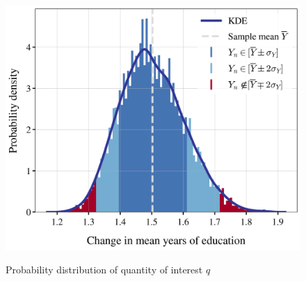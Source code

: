 \documentclass[a4paper,12pt]{article}
\begin{document}
\begin{figure}[H]
	\caption{Probability distribution of quantity of interest $q$}
	\centering
	\includegraphics[scale=0.5]{../../../scrypy/figures/distplot}
	\label{fig:dist}
\end{figure}
\end{document}
